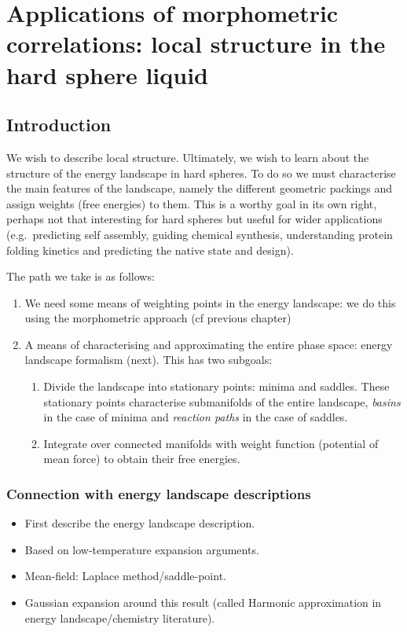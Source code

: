 \documentclass[12pt]{report}
\begin{document}
\chapter{Applications of morphometric correlations: local structure in the hard sphere liquid}

\section{Introduction}

We wish to describe local structure.
Ultimately, we wish to learn about the structure of the energy landscape in hard spheres.
To do so we must characterise the main features of the landscape, namely the different geometric packings and assign weights (free energies) to them.
This is a worthy goal in its own right, perhaps not that interesting for hard spheres but useful for wider applications (e.g.\ predicting self assembly, guiding chemical synthesis, understanding protein folding kinetics and predicting the native state and design).

The path we take is as follows:
\begin{enumerate}
\item We need some means of weighting points in the energy landscape: we do this using the morphometric approach (cf previous chapter)
\item A means of characterising and approximating the entire phase space: energy landscape formalism (next). This has two subgoals:
  \begin{enumerate}
  \item Divide the landscape into stationary points: minima and saddles.
    These stationary points characterise submanifolds of the entire landscape, \emph{basins} in the case of minima and \emph{reaction paths} in the case of saddles.
  \item Integrate over connected manifolds with weight function (potential of mean force) to obtain their free energies.
  \end{enumerate}
\end{enumerate}


\subsection{Connection with energy landscape descriptions}

\begin{itemize}
  \item First describe the energy landscape description.
  \item Based on low-temperature expansion arguments.
  \item Mean-field: Laplace method/saddle-point.
  \item Gaussian expansion around this result (called Harmonic approximation in energy landscape/chemistry literature).
\end{itemize}
\end{document}
